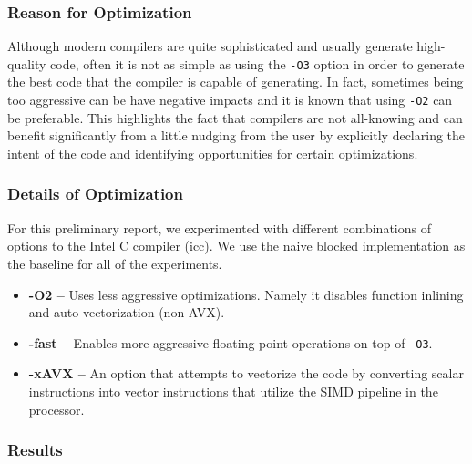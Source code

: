 
\subsubsection{Reason for Optimization}

Although modern compilers are quite sophisticated and usually generate
high-quality code, often it is not as simple as using the {\tt{-O3}}
option in order to generate the best code that the compiler is capable of
generating. In fact, sometimes being too aggressive can be have negative
impacts and it is known that using {\tt{-O2}} can be preferable. This
highlights the fact that compilers are not all-knowing and can benefit
significantly from a little nudging from the user by explicitly declaring
the intent of the code and identifying opportunities for certain
optimizations.
\smallskip

\subsubsection{Details of Optimization}

For this preliminary report, we experimented with different combinations
of options to the Intel C compiler (icc). We use the naive blocked
implementation as the baseline for all of the experiments.
\smallskip

\begin{itemize}
  \item \textbf{-O2 --} Uses less aggressive optimizations. Namely it disables
function inlining and auto-vectorization (non-AVX).

  \item \textbf{-fast --} Enables more aggressive floating-point operations on
top of {\tt{-O3}}.

  \item \textbf{-xAVX --} An option that attempts to vectorize the code by
converting scalar instructions into vector instructions that utilize the
SIMD pipeline in the processor.
\end{itemize}
\smallskip

\subsubsection{Results}

